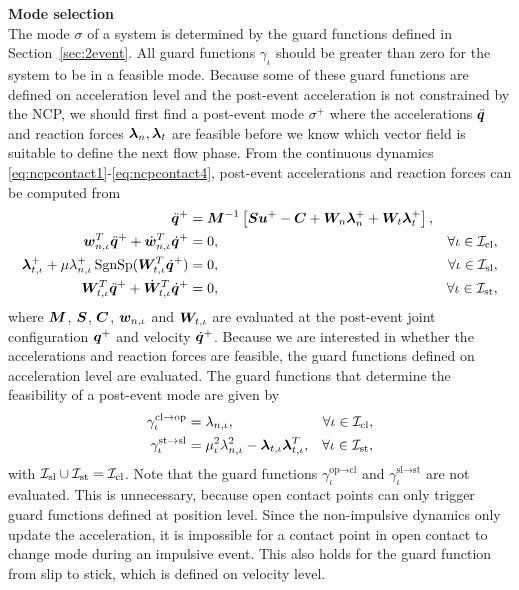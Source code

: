\documentclass[../DC2017114Bouma.tex]{subfiles}
\begin{document}
\textbf{Mode selection}\\
The mode $\sigma$ of a system is determined by the guard functions defined in Section~\ref{sec:2event}. All guard functions $\gamma_\iota$ should be greater than zero for the system to be in a feasible mode. Because some of these guard functions are defined on acceleration level and the post-event acceleration is not constrained by the NCP, we should first find a post-event mode $\sigma^+$ where the accelerations $\ddot{{\boldsymbol{q}}}$ and reaction forces $\boldsymbol{\lambda}_{n},\boldsymbol{\lambda}_{t}$ are feasible before we know which vector field is suitable to define the next flow phase. From the continuous dynamics \eqref{eq:ncpcontact1}-\eqref{eq:ncpcontact4}, post-event accelerations and reaction forces can be computed from
\begin{align}
\ddot{{\boldsymbol{q}}}^+ &= {\boldsymbol{M}}^{-1}\left[{\boldsymbol{S}}{\boldsymbol{u}}^+ - {\boldsymbol{C}} + {\boldsymbol{W}}_{n}\boldsymbol{\lambda}^+_{n} + {\boldsymbol{W}}_{t}\boldsymbol{\lambda}^+_{t}\right], &  \label{eq:2nonimp1}\\
{\boldsymbol{w}}^T_{n,\iota}\ddot{{\boldsymbol{q}}}^+ + \dot{{\boldsymbol{w}}}^T_{n,\iota}\dot{{\boldsymbol{q}}}^+ &= 0, & \forall \iota\in\mathcal{I}_{\text{cl}},\label{eq:2nonimp2}\\
\boldsymbol{\lambda}^+_{t,\iota} + \mu\lambda^+_{n,\iota}\operatorname{\text{SgnSp}}({\boldsymbol{W}}_{t,\iota}^T\dot{{\boldsymbol{q}}}^+) &= 0, & \forall \iota\in\mathcal{I}_{\text{sl}},\label{eq:2nonimp3}\\
{\boldsymbol{W}}^T_{t,\iota}\ddot{{\boldsymbol{q}}}^+ + \dot{{\boldsymbol{W}}}^T_{t,\iota}\dot{{\boldsymbol{q}}}^+ &= 0, & \forall \iota\in\mathcal{I}_{\text{st}},\label{eq:2nonimp4}
\end{align}
where ${\boldsymbol{M}}$, ${\boldsymbol{S}}$, ${\boldsymbol{C}}$, ${\boldsymbol{w}}_{n,\iota}$ and ${\boldsymbol{W}}_{t,\iota}$ are evaluated at the post-event joint configuration ${\boldsymbol{q}}^+$ and velocity $\dot{{\boldsymbol{q}}}^+$. Because we are interested in whether the accelerations and reaction forces are feasible, the guard functions defined on acceleration level are evaluated. The guard functions that determine the feasibility of a post-event mode are given by
\begin{align}
\gamma^{\text{cl}\rightarrow\text{op}}_{\iota} &= \lambda_{n,\iota}, & \forall \iota\in\mathcal{I}_{\text{cl}},\\
\gamma^{\text{st}\rightarrow\text{sl}}_{\iota} &= \mu_{\iota}^2\lambda_{n,\iota}^2 - \boldsymbol{\lambda}_{t,\iota}\boldsymbol{\lambda}_{t,\iota}^T, & \forall \iota\in\mathcal{I}_{\text{st}},
\end{align}
with $\mathcal{I}_{\text{sl}}\cup\mathcal{I}_{\text{st}}=\mathcal{I}_{\text{cl}}$. Note that the guard functions $\gamma_{\iota}^{\text{op}\rightarrow\text{cl}}$ and $\gamma_{\iota}^{\text{sl}\rightarrow\text{st}}$ are not evaluated. This is unnecessary, because open contact points can only trigger guard functions defined at position level. Since the non-impulsive dynamics only update the acceleration, it is impossible for a contact point in open contact to change mode during an impulsive event. This also holds for the guard function from slip to stick, which is defined on velocity level.
\end{document}
